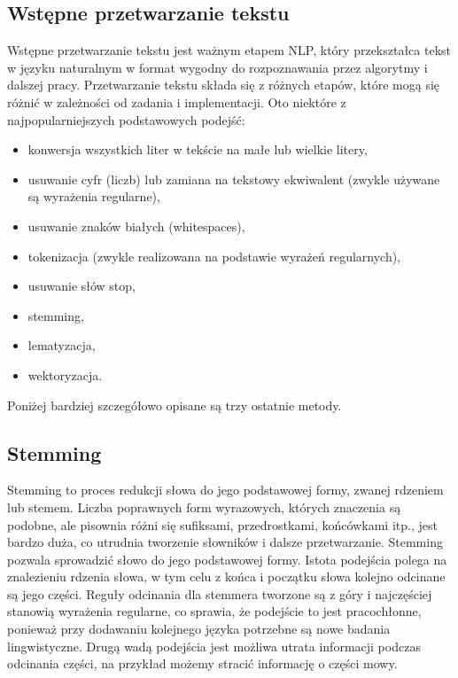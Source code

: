 	\subsection{Wstępne przetwarzanie tekstu}
		Wstępne przetwarzanie tekstu jest ważnym etapem NLP, który przekształca tekst w języku naturalnym w format wygodny do rozpoznawania przez algorytmy i dalszej pracy. Przetwarzanie tekstu składa się z różnych etapów, które mogą się różnić w zależności od zadania i implementacji. Oto niektóre z najpopularniejszych podstawowych podejść:
	\begin{itemize}
		\item konwersja wszystkich liter w tekście na małe lub wielkie litery,
		\item usuwanie cyfr (liczb) lub zamiana na tekstowy ekwiwalent (zwykle używane są wyrażenia regularne),
		\item usuwanie znaków białych (whitespaces),
		\item tokenizacja (zwykle realizowana na podstawie wyrażeń regularnych),
		\item usuwanie słów stop,
		\item stemming,
		\item lematyzacja,
		\item wektoryzacja.
	\end{itemize}
	Poniżej bardziej szczegółowo opisane są trzy ostatnie metody.



	\subsection{Stemming}
		 Stemming to proces redukcji słowa do jego podstawowej formy, zwanej rdzeniem lub stemem. Liczba poprawnych form wyrazowych, których znaczenia są podobne, ale pisownia różni się sufiksami, przedrostkami, końcówkami itp., jest bardzo duża, co utrudnia tworzenie słowników i dalsze przetwarzanie. Stemming pozwala sprowadzić słowo do jego podstawowej formy. Istota podejścia polega na znalezieniu rdzenia słowa, w tym celu z końca i początku słowa kolejno odcinane są jego części. Reguły odcinania dla stemmera tworzone są z góry i najczęściej stanowią wyrażenia regularne, co sprawia, że podejście to jest pracochłonne, ponieważ przy dodawaniu kolejnego języka potrzebne są nowe badania lingwistyczne. Drugą wadą podejścia jest możliwa utrata informacji podczas odcinania części, na przykład możemy stracić informację o części mowy.


